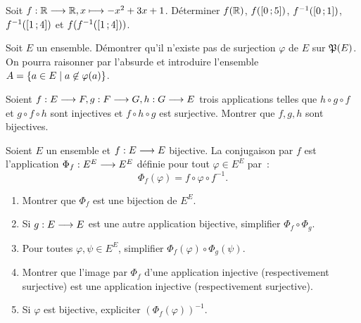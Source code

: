 \begin{exercice}
    Soit \(f:\mathbb{R} \longrightarrow \mathbb{R}, x \longmapsto -x^2+3x+1\). Déterminer \(f(\mathbb{R})\), 
    \(f(\left[ 0 \, ;  5 \right])\), \(f^{-1}(\left[ 0 \, ;  1 \right])\), 
    \(f^{-1}(\left[ 1 \, ;  4 \right])\) et \(f(f^{-1}(\left[ 1 \, ;  4 \right]))\).
\end{exercice}

\begin{exercice}
    Soit \(E\) un ensemble. Démontrer qu'il n'existe pas de surjection 
    \(\varphi\) de \(E\) sur \(\mathfrak{P}(E)\). On pourra raisonner par l'absurde et 
    introduire l'ensemble \(A = \left\{a \in E\mathrel{}\middle|\mathrel{}a \not\in \varphi(a)\right\}\).
\end{exercice}

\begin{exercice}
    Soient \(f:E \longrightarrow F, g:F \longrightarrow G, h:G \longrightarrow E\) 
    trois applications telles que \(h \circ g \circ f\) et \(g \circ f \circ h\) 
    sont injectives et \(f \circ h \circ g\) est surjective. Montrer que \(f, g, 
    h\) sont bijectives.
\end{exercice}

\begin{exercice}[Conjugaison]
    Soient \(E\) un ensemble et \(f:E \longrightarrow E\) bijective. La 
    conjugaison par \(f\) est l'application \(\Phi_f:E^E \longrightarrow E^E\) 
    définie pour tout \(\varphi \in E^E\) par~:
    \begin{equation}
        \Phi_f(\varphi) = f \circ \varphi \circ f^{-1}.
    \end{equation}
    \begin{enumerate}
        \item Montrer que \(\Phi_f\) est une bijection de \(E^E\).
        \item Si \(g:E \longrightarrow E\) est une autre application bijective, 
            simplifier \(\Phi_f \circ \Phi_g\).
        \item Pour toutes \(\varphi, \psi \in E^E\), simplifier  
            \(\Phi_f(\varphi) \circ \Phi_g(\psi)\).
        \item Montrer que l'image par \(\Phi_f\) d'une application injective 
            (respectivement surjective) est une application injective 
            (respectivement surjective).
        \item Si \(\varphi\) est bijective, expliciter \((\Phi_f(\varphi))^{-1}\).
    \end{enumerate}
\end{exercice}

